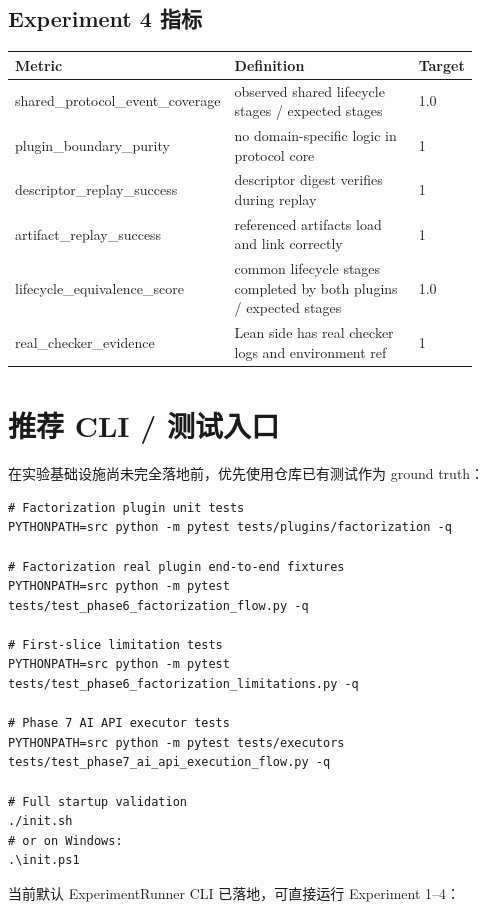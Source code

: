 \documentclass[11pt]{ctexart}
\begin{document}
\subsection{Experiment 4 指标}

\begin{longtable}{p{0.35\linewidth}p{0.45\linewidth}p{0.12\linewidth}}
\toprule
Metric & Definition & Target \\
\midrule
shared\_protocol\_event\_coverage & observed shared lifecycle stages / expected stages & 1.0 \\
plugin\_boundary\_purity & no domain-specific logic in protocol core & 1 \\
descriptor\_replay\_success & descriptor digest verifies during replay & 1 \\
artifact\_replay\_success & referenced artifacts load and link correctly & 1 \\
lifecycle\_equivalence\_score & common lifecycle stages completed by both plugins / expected stages & 1.0 \\
real\_checker\_evidence & Lean side has real checker logs and environment ref & 1 \\
\bottomrule
\end{longtable}

\section{推荐 CLI / 测试入口}

在实验基础设施尚未完全落地前，优先使用仓库已有测试作为 ground truth：

\begin{lstlisting}
# Factorization plugin unit tests
PYTHONPATH=src python -m pytest tests/plugins/factorization -q

# Factorization real plugin end-to-end fixtures
PYTHONPATH=src python -m pytest tests/test_phase6_factorization_flow.py -q

# First-slice limitation tests
PYTHONPATH=src python -m pytest tests/test_phase6_factorization_limitations.py -q

# Phase 7 AI API executor tests
PYTHONPATH=src python -m pytest tests/executors tests/test_phase7_ai_api_execution_flow.py -q

# Full startup validation
./init.sh
# or on Windows:
.\init.ps1
\end{lstlisting}

当前默认 ExperimentRunner CLI 已落地，可直接运行 Experiment 1--4：
\end{document}
